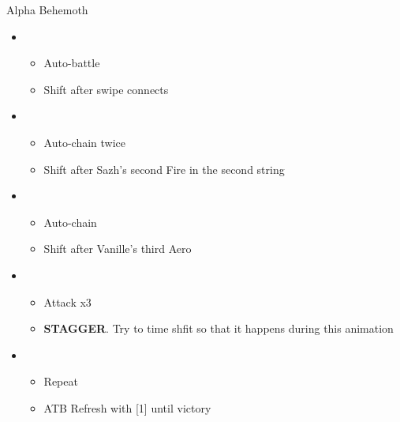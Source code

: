 \begin{multicols}{2}
\begin{battle}{Alpha Behemoth}
\begin{itemize}
    \item \first
    \begin{itemize}
        \item Auto-battle
        \item Shift after swipe connects
    \end{itemize}
    \item \third
    \begin{itemize}
        \item Auto-chain twice
        \item Shift after Sazh's second Fire in the second string
    \end{itemize}
    \item \fourth
    \begin{itemize}
        \item Auto-chain
        \item Shift after Vanille's third Aero
    \end{itemize}
    \item \first
    \begin{itemize}
        \item Attack x3
        \item \textbf{STAGGER}. Try to time shfit so that it happens during this animation
    \end{itemize}
    \item \fifth
    \begin{itemize}
        \item Repeat
        \item ATB Refresh with [1] until victory
    \end{itemize}
\end{itemize}
\end{battle}



 
\vfill


\end{multicols}
